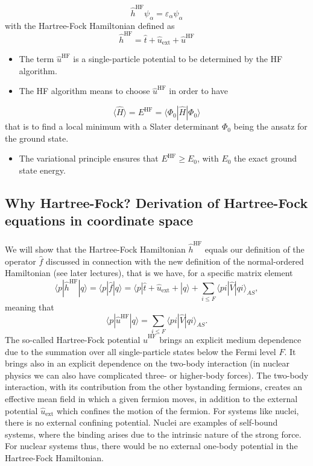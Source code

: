 \documentclass[%
twoside,                 %
final,                   %
10pt]{article}
\begin{document}
\noindent
\[ 
\hat{h}^{\mathrm{HF}}\psi_{\alpha} = \varepsilon_{\alpha}\psi_{\alpha}
\]
with the Hartree-Fock Hamiltonian defined as
\[
\hat{h}^{\mathrm{HF}}=\hat{t}+\hat{u}_{\mathrm{ext}}+\hat{u}^{\mathrm{HF}}
\]
\begin{itemize}
  \item The term  $\hat{u}^{\mathrm{HF}}$ is a single-particle potential to be determined by the HF algorithm.

  \item The HF algorithm means to choose $\hat{u}^{\mathrm{HF}}$ in order to have 
\end{itemize}

\noindent
\[ \langle \hat{H} \rangle = E^{\mathrm{HF}}= \langle \Phi_0 | \hat{H}|\Phi_0 \rangle
\]
that is to find a local minimum with a Slater determinant $\Phi_0$ being the ansatz for the ground state. 
\begin{itemize}
  \item The variational principle ensures that $E^{\mathrm{HF}} \ge E_0$, with $E_0$ the exact ground state energy.
\end{itemize}

\noindent




\subsection*{Why Hartree-Fock? Derivation of Hartree-Fock equations in coordinate space}

\paragraph{}
We will show that the Hartree-Fock Hamiltonian $\hat{h}^{\mathrm{HF}}$ equals our definition of the operator $\hat{f}$ discussed in connection with the new definition of the normal-ordered Hamiltonian (see later lectures), that is we have, for a specific matrix element
\[
\langle p |\hat{h}^{\mathrm{HF}}| q \rangle =\langle p |\hat{f}| q \rangle=\langle p|\hat{t}+\hat{u}_{\mathrm{ext}}+|q \rangle +\sum_{i\le F} \langle pi | \hat{V} | qi\rangle_{AS},
\]
meaning that
\[
\langle p|\hat{u}^{\mathrm{HF}}|q\rangle = \sum_{i\le F} \langle pi | \hat{V} | qi\rangle_{AS}.
\]
The so-called Hartree-Fock potential $\hat{u}^{\mathrm{HF}}$ brings an explicit medium dependence due to the summation over all single-particle states below the Fermi level $F$. It brings also in an explicit dependence on the two-body interaction (in nuclear physics we can also have complicated three- or higher-body forces). The two-body interaction, with its contribution from the other bystanding fermions, creates an effective mean field in which a given fermion moves, in addition to the external potential $\hat{u}_{\mathrm{ext}}$ which confines the motion of the fermion. For systems like nuclei, there is no external confining potential. Nuclei are examples of self-bound systems, where the binding arises due to the intrinsic nature of the strong force. For nuclear systems thus, there would be no external one-body potential in the Hartree-Fock Hamiltonian.
\end{document}
